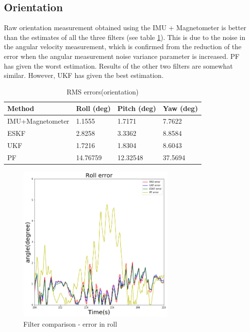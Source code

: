 \subsection{Orientation}
Raw orientation measurement obtained using the \gls{IMU} + Magnetometer is better than the estimates of all the three filters (see table \ref{table:ch:RMSErrorRotation}). This is due to the noise in the angular velocity measurement, which is confirmed from the reduction of the error when the angular measurement noise variance parameter is increased. \gls{PF} has given the worst estimation. Results of the other two filters are somewhat similar. However, \gls{UKF} has given the best
estimation.
\begin{table}[h]
    \centering
    \begin{tabular}{|p{4cm}|p{3cm}|p{3cm}|p{3cm}|} 
        \hline
        \textbf{Method} & \textbf{Roll (deg)} & \textbf{Pitch (deg)} & \textbf{Yaw (deg)} \\
        \hline
        \gls{IMU}+Magnetometer & 1.1555 &1.7171 &7.7622\\
        \hline
        ESKF& 2.8258& 3.3362& 8.8584\\
        \hline
        UKF &1.7216& 1.8304& 8.6043
        \\
        \hline
        PF &14.76759& 12.32548 &37.5694
        \\
        \hline
    \end{tabular}
    \caption{\gls{RMS} errors(orientation)}
    \label{table:ch:RMSErrorRotation}
\end{table}

\begin{figure}[h]
\centering
	\includegraphics[width=0.7\textwidth]{figs/roll.png}
	\caption{Filter comparison - error in roll}
	\label{fig:ch:errorRoll}
\end{figure}

